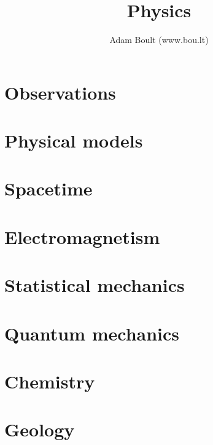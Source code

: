\documentclass[oneside]{book}
\begin{document}
\author{Adam Boult (www.bou.lt)}
\title{Physics}
\maketitle

\setcounter{tocdepth}{0}
\tableofcontents



\part{Observations}

\part{Physical models}

\part{Spacetime}







\part{Electromagnetism}


\part{Statistical mechanics}


\part{Quantum mechanics}




\part{Chemistry}







\part{Geology}

\end{document}
